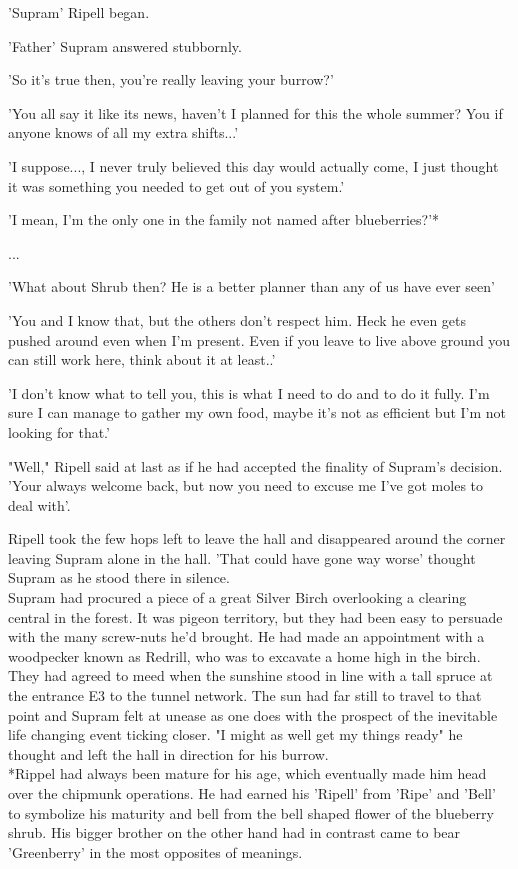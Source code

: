 \documentclass[smalldemyvopaper,11pt,twoside,onecolumn,openright,extrafontsizes]{memoir}
\begin{document}
'Supram' Ripell began.

'Father' Supram answered stubbornly.

'So it's true then, you're really leaving your burrow?'

'You all say it like its news, haven't I planned for this the whole summer? You if anyone knows of all my extra shifts...'

'I suppose..., I never truly believed this day would actually come, I just thought it was something you needed to get out of you system.'

'I mean, I'm the only one in the family not named after blueberries?'*

...

'What about Shrub then? He is a better planner than any of us have ever seen'

'You and I know that, but the others don't respect him. Heck he even gets pushed around even when I'm present.
Even if you leave to live above ground you can still work here, think about it at least..'

'I don't know what to tell you, this is what I need to do and to do it fully. I'm sure I can manage to gather my own food, maybe it's not as efficient but I'm not looking for that.'

"Well," Ripell said at last as if he had accepted the finality of Supram's decision. 'Your always welcome back, but now you need to excuse me I've got moles to deal with'.

Ripell took the few hops left to leave the hall and disappeared around the corner leaving Supram alone in the hall. 'That could have gone way worse' thought Supram as he stood there in silence. \\

Supram had procured a piece of a great Silver Birch overlooking a clearing central in the forest. It was pigeon territory, but they had been easy to persuade with the many screw-nuts he'd brought. He had made an appointment with a woodpecker known as Redrill, who was to excavate a home high in the birch. They had agreed to meed when the sunshine stood in line with a tall spruce at the entrance E3 to the tunnel network. The sun had far still to travel to that point and Supram felt at unease as one does with the prospect of the inevitable life changing event ticking closer. "I might as well get my things ready" he thought and left the hall in direction for his burrow.\\

*Rippel had always been mature for his age, which eventually made him head over the chipmunk operations. He had earned his 'Ripell' from 'Ripe' and 'Bell' to symbolize his maturity and bell from the bell shaped flower of the blueberry shrub. His bigger brother on the other hand had in contrast came to bear 'Greenberry' in the most opposites of meanings.  
\end{document}
